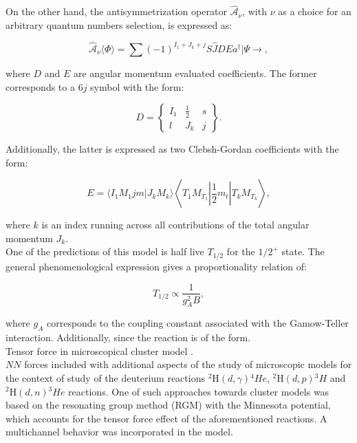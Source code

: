 \documentclass[openany]{book}
\begin{document}
On the other hand, the antisymmetrization operator $\hat{\mathcal{A}}_\nu$, with $\nu$ as a choice for an arbitrary quantum numbers selection, is expressed as: 

\begin{equation}\label{eq:micro_NCSM_beta_antisymmetrization}
	\hat {\mathcal{A}}_\nu  \langle \Phi \rangle  = \sum { (-1)^{I_1 + J_k + j} \hat S \hat J D E a^{\dagger} | \Psi \rightarrow },
\end{equation}

where $D$ and $E$ are angular momentum evaluated coefficients. The former corresponds to a $6j$ symbol with the form: 

\begin{equation}\label{eq:micro_NCSM_beta_antisymmetrization_9j}
	D = \left \{  \begin{matrix}
		I_1 & \frac{1}{2} & s \\
		l 		& J_k & j
	\end{matrix}   \right \}. 
\end{equation}

Additionally, the latter is expressed as two Clebsh-Gordan coefficients with the form: 

\begin{equation}\label{eq:micro_NCSM_beta_antisymmetrization_clebshGordan}
	E =  \langle I_1 M_1 jm |  J_kM_k  \rangle \left \langle T_1 M_{T_1} \left| \frac{1}{2} m_t \right|  T_k M_{T_k} \right  \rangle,
\end{equation}

where $k$ is an index running across all contributions of the total angular momentum $J_k$.  \\

One of the predictions of this model is half live $T_{1/2}$ for the $1/2^{+}$ state. The general phenomenological expression gives a proportionality relation of: 

 \begin{equation}\label{eq:micro_NCSH_beta_halflive}
	T_{1/2} \propto \frac{1}{g^2_A B},
\end{equation}

where $g_A$ corresponds to the coupling constant associated with the Gamow-Teller interaction. Additionally, since the reaction is of the form.\\


Tensor force in microscopical cluster model \cite{arai_aoyama_suzuki_descouvemont_baye_2013}. \\

$NN$ forces included with additional aspects of the study of microscopic models for the context of study of the deuterium reactions $\mathrm{{}^{2}H}(d, \gamma){}^{4}He$, $\mathrm{{}^{2}H}(d, p){}^{3}H$ and $\mathrm{{}^{2}H}(d, n){}^{3}He$ reactions. One of such approaches towards cluster models was based on the resonating group method (RGM) with the Minnesota potential, which accounts for the tensor force effect of the aforementioned reactions. A multichannel behavior was incorporated in the model. 
\end{document}
